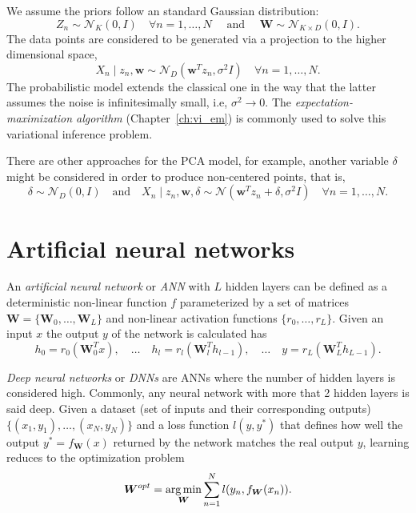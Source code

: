 We assume the priors follow an standard Gaussian distribution:
\[
  Z_{n} \sim \mathcal{N}_{K}(0, I) \quad \forall n =1,\dots,N \quad \text{ and } \quad \bm{W} \sim \mathcal{N}_{K\times D}(0, I).
\]
The data points are considered to be generated via a projection to the higher dimensional space,
\[
  X_{n} \mid z_{n}, \bm{w} \sim \mathcal{N}_{D}(\bm{w}^{T}z_{n}, \sigma^{2}I)\quad \forall n = 1,\dots, N.
\]
The probabilistic model extends the classical one in the way that the latter assumes the noise is infinitesimally small, i.e, \(\sigma^{2} \to 0\). The \emph{expectation-maximization algorithm} (Chapter~\ref{ch:vi_em}) is commonly used to solve this variational inference problem.

There are other approaches for the PCA model, for example, another variable \(\delta\) might be considered in order to produce non-centered points, that is,
\[
  \delta \sim \mathcal{N}_{D}(0, I) \quad \text{and} \quad   X_{n} \mid z_{n}, \bm{w}, \delta \sim \mathcal{N}(\bm{w}^{T}z_{n} + \delta, \sigma^{2}I)\quad \forall n = 1,\dots, N.
\]

\section{Artificial neural networks}

An \emph{artificial neural network} or \emph{ANN} with \(L\) hidden layers can be defined as a deterministic non-linear function \(f\) parameterized by a set of matrices \(\bm{W} = \{\bm{W}_{0},\dots, \bm{W}_{L}\}\) and non-linear activation functions \(\{r_{0},\dots, r_{L}\}\). Given an input \(x\) the output \(y\) of the network is calculated has
\[
  h_{0} = r_{0}(\bm{W}^{T}_{0}x), \quad \dots \quad h_{l} = r_{l}(\bm{W}_{l}^{T}h_{l-1}), \quad \dots \quad y = r_{L}(\bm{W}_{L}^{T}h_{L-1}).
\]

\emph{Deep neural networks} or \emph{DNNs} are ANNs where the number of hidden layers is considered high. Commonly, any neural network with more that 2 hidden layers is said deep. Given a dataset (set of inputs and their corresponding outputs) \(\{(x_{1}, y_{1}), \dots, (x_{N}, y_{N})\}\) and a loss function \(l(y,y^{*})\) that defines how well the output \(y^{*} = f_{\bm{W}}(x)\)  returned by the network matches the real output \(y\), learning reduces to the optimization problem
\[
  \bm{W}^{opt} = \operatorname*{arg\,min}_{\bm{W}} \sum_{n=1}^{N}l(y_{n}, f_{\bm{W}}(x_{n})).
\]

